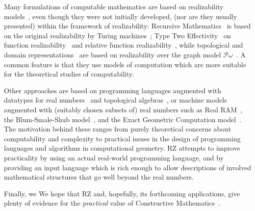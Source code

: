 Many formulations of computable mathematics are based on realizability
models~\cite{Bauer:00}, even though they were not initially developed,
(nor are they usually presented) within the framework of realizability:
Recursive Mathematics~\cite{ershov98:_handb_recur_mathem} is based on
the original realizability by Turing machines~\cite{KleeneSC:intint};
Type Two Effectivity~\cite{Wei00} on function
realizability~\cite{KleeneSC:fouim} and relative function
realizability~\cite{BirkedalL:devttc}, while topological and domain
representations~\cite{Bla97a,Bauer:Birkedal:Scott:98} are based on
realizability over the graph model
$\mathcal{P}\omega$~\cite{ScottD:dattl}. A common feature is
that they use models of computation which are more suitable for the
theoretical studies of computability. 

\iflong
Other approaches are based on programming languages augmented with
datatypes for real numbers~\cite{Escardo:97,marcial-romero04:_seman}
and topological algebras~\cite{TZ98}, or machine models augmented with
(suitably chosen subsets of) real numbers such as Real
RAM~\cite{borodin75}, the Blum-Smale-Shub
model~\cite{blum98:_compl_real_comput}, and the Exact Geometric
Computation model~\cite{yap06:_theor_real_comput_egc}. The motivation
behind these ranges from purely theoretical concerns about
computability and complexity to practical issues in the design of
programming languages and algorithms in computational geometry. RZ
attempts to improve practicality by using an actual
real-world programming language, and by providing an input language
which is rich enough to allow descriptions of involved mathematical
structures that go well beyond the real numbers.

Finally, we
\else %
We
\fi
hope that RZ and, hopefully, its forthcoming applications,
give plenty of evidence for the \emph{practical} value of Constructive
Mathematics~\cite{Bishop:Bridges:85}.



